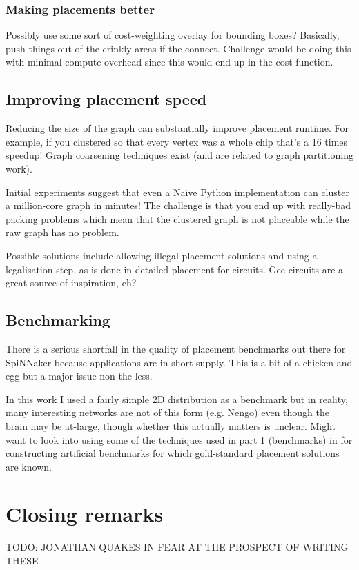 			\subsubsection{Making placements better}
				
				Possibly use some sort of cost-weighting overlay for bounding boxes?
				Basically, push things out of the crinkly areas if the connect. Challenge
				would be doing this with minimal compute overhead since this would end up
				in the cost function.
		
		\subsection{Improving placement speed}
			
			Reducing the size of the graph can substantially improve placement runtime.
			For example, if you clustered so that every vertex was a whole chip that's a
			16 times speedup! Graph coarsening techniques exist (and are related to
			graph partitioning work).
			
			Initial experiments suggest that even a Naive Python implementation can
			cluster a million-core graph in minutes! The challenge is that you end up
			with really-bad packing problems which mean that the clustered graph is not
			placeable while the raw graph has no problem.
			
			Possible solutions include allowing illegal placement solutions and using a
			legalisation step, as is done in detailed placement for circuits. Gee
			circuits are a great source of inspiration, eh?
		
		\subsection{Benchmarking}
			
			There is a serious shortfall in the quality of placement benchmarks out
			there for SpiNNaker because applications are in short supply.  This is a
			bit of a chicken and egg but a major issue non-the-less.
			
			In this work I used a fairly simple 2D distribution as a benchmark but in
			reality, many interesting networks are not of this form (e.g. Nengo) even
			though the brain may be at-large, though whether this actually matters is
			unclear.  Might want to look into using some of the techniques used in
			part 1 (benchmarks) in \cite{nam07} for constructing artificial
			benchmarks for which gold-standard placement solutions are known.
	
	\section{Closing remarks}
		
		TODO: JONATHAN QUAKES IN FEAR AT THE PROSPECT OF WRITING THESE
